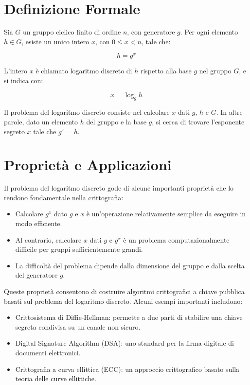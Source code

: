 \documentclass[a4paper,12pt]{report}
\begin{document}
%
%
%
%
\section{Definizione Formale}
Sia $G$ un gruppo ciclico finito di ordine $n$, con generatore $g$. Per ogni elemento $h \in G$, esiste un unico intero $x$, con $0 \leq x < n$, tale che:

\[
h = g^x
\]

L'intero $x$ è chiamato logaritmo discreto di $h$ rispetto alla base $g$ nel gruppo $G$, e si indica con:

\[
x = \log_g h
\]

Il problema del logaritmo discreto consiste nel calcolare $x$ dati $g$, $h$ e $G$. In altre parole, dato un elemento $h$ del gruppo e la base $g$, si cerca di trovare l'esponente segreto $x$ tale che $g^x = h$.

\section{Proprietà e Applicazioni}
Il problema del logaritmo discreto gode di alcune importanti proprietà che lo rendono fondamentale nella crittografia:

\begin{itemize}
    \item Calcolare $g^x$ dato $g$ e $x$ è un'operazione relativamente semplice da eseguire in modo efficiente.
    \item Al contrario, calcolare $x$ dati $g$ e $g^x$ è un problema computazionalmente difficile per gruppi sufficientemente grandi.
    \item La difficoltà del problema dipende dalla dimensione del gruppo e dalla scelta del generatore $g$.
\end{itemize}

Queste proprietà consentono di costruire algoritmi crittografici a chiave pubblica basati sul problema del logaritmo discreto. Alcuni esempi importanti includono:

\begin{itemize}
    \item Crittosistema di Diffie-Hellman: permette a due parti di stabilire una chiave segreta condivisa su un canale non sicuro.
    \item Digital Signature Algorithm (DSA): uno standard per la firma digitale di documenti elettronici.
    \item Crittografia a curva ellittica (ECC): un approccio crittografico basato sulla teoria delle curve ellittiche.
\end{itemize}
\end{document}
